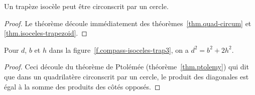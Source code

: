 \begin{theorem}
Un trapèze isocèle peut être circonscrit par un cercle.
\end{theorem}

\begin{proof}
Le théorème découle immédiatement des théorèmes~\ref{thm.quad-circum} et  \ref{thm.isoceles-trapezoid}.
\end{proof}

\begin{theorem}\label{thm.ptolemy-trap}
Pour $d$, $b$ et $h$ dans la figure~\ref{f.compass-isoceles-trap3}, on a  $d^2=b^2+2h^2$.
\end{theorem}

\begin{proof}
Ceci découle du théorème de Ptolémée (théorème~\ref{thm.ptolemy}) qui dit que dans un quadrilatère circonscrit par un cercle, le produit des diagonales est égal à la somme des produits des côtés opposés.
\end{proof}

